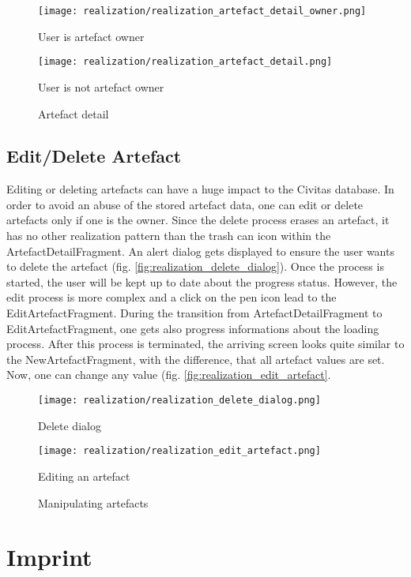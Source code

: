 \begin{figure}[htb]
  \texttt{[image: realization/realization\_artefact\_detail\_owner.png]}
  \caption{User is artefact owner}\label{fig:realization_artefact_detail_owner}
\endminipage\hfill
{}
  \texttt{[image: realization/realization\_artefact\_detail.png]}
  \caption{User is not artefact owner}\label{fig:realization_artefact_detail}
\endminipage\hfill
\caption{Artefact detail}
\label{fig:artefact_detail}
\end{figure}

\subsection{Edit/Delete Artefact}
Editing or deleting artefacts can have a huge impact to the Civitas database. In order to avoid an abuse of the stored artefact data, one can edit or delete artefacts only if one is the owner. Since the delete process erases an artefact, it has no other realization pattern than the trash can icon within the ArtefactDetailFragment. An alert dialog gets displayed to ensure the user wants to delete the artefact (fig. \ref{fig:realization_delete_dialog}). Once the process is started, the user will be kept up to date about the progress status. However, the edit process is more complex and a click on the pen icon lead to the EditArtefactFragment. During the transition from ArtefactDetailFragment to EditArtefactFragment, one gets also progress informations about the loading process. After this process is terminated, the arriving screen looks quite similar to the NewArtefactFragment, with the difference, that all artefact values are set. Now, one can change any value (fig. \ref{fig:realization_edit_artefact}.

\begin{figure}[H]
\centering
{}
  \texttt{[image: realization/realization\_delete\_dialog.png]}
  \caption[Delete dialog]{Delete dialog}\label{fig:realization_delete_dialog}
\endminipage\hfill
{}
  \texttt{[image: realization/realization\_edit\_artefact.png]}
  \caption[Editing an artefact]{Editing an artefact}
  \label{fig:realization_edit_artefact}
\endminipage\hfill
\caption{Manipulating artefacts}
\label{fig:artefact_edit_delete}
\end{figure}

\section{Imprint}


